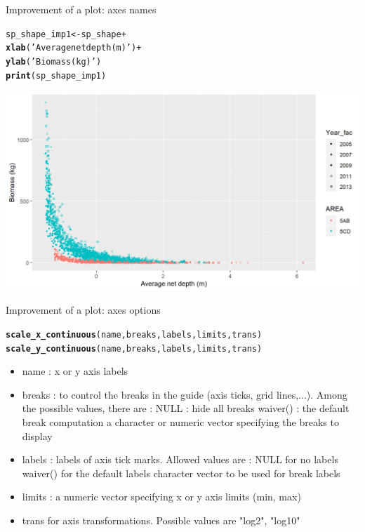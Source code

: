 \documentclass{beamer}\usepackage[]{graphicx}\usepackage[]{color}
\makeatletter
\newcommand{\hlstr}[1]{\textcolor[rgb]{0.192,0.494,0.8}{#1}}%
\newcommand{\hlopt}[1]{\textcolor[rgb]{0,0,0}{#1}}%
\newcommand{\hlstd}[1]{\textcolor[rgb]{0.345,0.345,0.345}{#1}}%
\newcommand{\hlkwb}[1]{\textcolor[rgb]{0.69,0.353,0.396}{#1}}%
\newcommand{\hlkwd}[1]{\textcolor[rgb]{0.737,0.353,0.396}{\textbf{#1}}}%
\newenvironment{kframe}{%
 \def\at@end@of@kframe{}%
 \ifinner\ifhmode%
  \def\at@end@of@kframe{\end{minipage}}%
  \begin{minipage}{\columnwidth}%
 \fi\fi%
 \def\FrameCommand##1{\hskip\@totalleftmargin \hskip-\fboxsep
 \colorbox{shadecolor}{##1}\hskip-\fboxsep
     \hskip-\linewidth \hskip-\@totalleftmargin \hskip\columnwidth}%
 \MakeFramed {\advance\hsize-\width
   \@totalleftmargin\z@ \linewidth\hsize
   \@setminipage}}%
 {\par\unskip\endMakeFramed%
 \at@end@of@kframe}
\newenvironment{knitrout}{}{} %
\makeatother
\begin{document}
\begin{frame}[fragile]{Improvement of a plot: axes names}
\begin{knitrout}\footnotesize
{}\color{fgcolor}\begin{kframe}
\begin{alltt}
\hlstd{sp_shape_imp1} \hlkwb{<-} \hlstd{sp_shape} \hlopt{+}
  \hlkwd{xlab}\hlstd{(}\hlstr{'Average net depth (m)'}\hlstd{)} \hlopt{+}
  \hlkwd{ylab}\hlstd{(}\hlstr{'Biomass (kg)'}\hlstd{)}
\hlkwd{print}\hlstd{(sp_shape_imp1)}
\end{alltt}
\end{kframe}

{\centering \includegraphics[width=.9\linewidth]{figure/sp_shape_imp1-1} 

}



\end{knitrout}
\end{frame}

\begin{frame}[fragile]{Improvement of a plot: axes options}
\begin{knitrout}\footnotesize
{}\color{fgcolor}\begin{kframe}
\begin{alltt}
\hlkwd{scale_x_continuous}\hlstd{(name, breaks, labels, limits, trans)}
\hlkwd{scale_y_continuous}\hlstd{(name, breaks, labels, limits, trans)}
\end{alltt}
\end{kframe}
\end{knitrout}
\begin{itemize}

\item    name : x or y axis labels
\item    breaks : to control the breaks in the guide (axis ticks, grid lines,...).
Among the possible values, there are :
NULL : hide all breaks
waiver() : the default break computation a character or numeric vector specifying the breaks to display
\item labels : labels of axis tick marks. Allowed values are :
NULL for no labels
waiver() for the default labels
character vector to be used for break labels
\item limits : a numeric vector specifying x or y axis limits (min, max)
\item trans for axis transformations. Possible values are "log2", "log10"
\end{itemize}
\end{frame}
\end{document}
